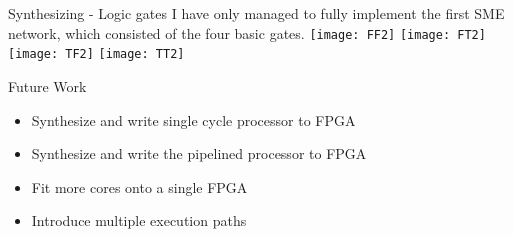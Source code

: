 \documentclass{beamer}
\begin{document}
\begin{frame}{Synthesizing - Logic gates}
  I have only managed to fully implement the first SME network, which consisted of the four basic gates.
  \texttt{[image: FF2]}
  \texttt{[image: FT2]}
  \texttt{[image: TF2]}
  \texttt{[image: TT2]}
\end{frame}

\begin{frame}{Future Work}
  \begin{itemize}
    \item Synthesize and write single cycle processor to FPGA
    \item Synthesize and write the pipelined processor to FPGA
    \item Fit more cores onto a single FPGA
    \item Introduce multiple execution paths
  \end{itemize}
\end{frame}

\AtBeginSection{}
\section*{}

%  
%  
\end{document}
